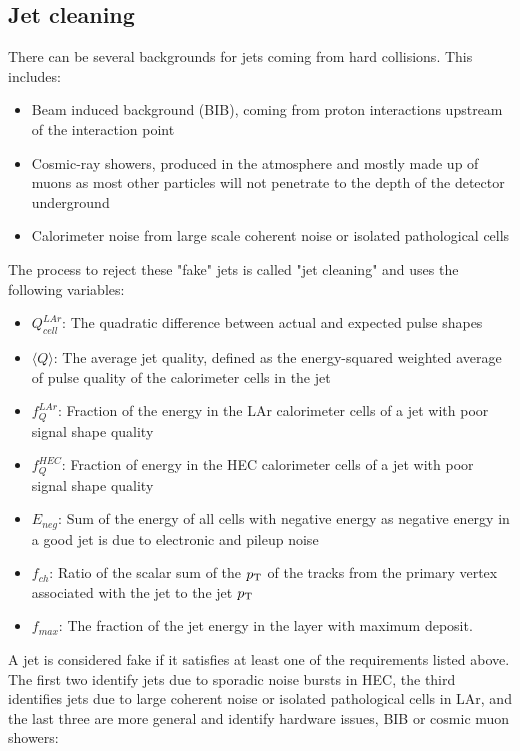 \subsection{Jet cleaning}
\label{section:jetcleaning}

There can be several backgrounds for jets coming from hard collisions.  This includes\cite{jetCleaning}:

\begin{itemize}
	\item Beam induced background (BIB), coming from proton interactions upstream of the interaction point
	\item Cosmic-ray showers, produced in the atmosphere and mostly made up of muons as most other particles will not penetrate to the depth of the detector underground
	\item Calorimeter noise from large scale coherent noise or isolated pathological cells
\end{itemize}

The process to reject these "fake" jets is called "jet cleaning" and uses the following variables:

\begin{itemize}
	\item $Q^{LAr}_{cell}$: The quadratic difference between actual and expected pulse shapes
	\item $\langle Q \rangle$: The average jet quality, defined as the energy-squared weighted average of pulse quality of the calorimeter cells in the jet
	\item $f_{Q}^{LAr}$: Fraction of the energy in the LAr calorimeter cells of a jet with poor signal shape quality
	\item $f_{Q}^{HEC}$: Fraction of energy in the HEC calorimeter cells of a jet with poor signal shape quality
	\item $E_{neg}$: Sum of the energy of all cells with negative energy as negative energy in a good jet is due to electronic and pileup noise
	\item $f_{ch}$: Ratio of the scalar sum of the $p_{\mathrm{T}}$ of the tracks from the primary vertex associated with the jet to the jet $p_{\mathrm{T}}$
	\item $f_{max}$: The fraction of the jet energy in the layer with maximum deposit.
\end{itemize}

A jet is considered fake if it satisfies at least one of the %
requirements listed above.  The first two identify jets due to sporadic noise bursts in HEC, the third identifies jets due to large coherent noise or isolated pathological cells in LAr, and the last three are more general and identify hardware issues, BIB or cosmic muon showers:

